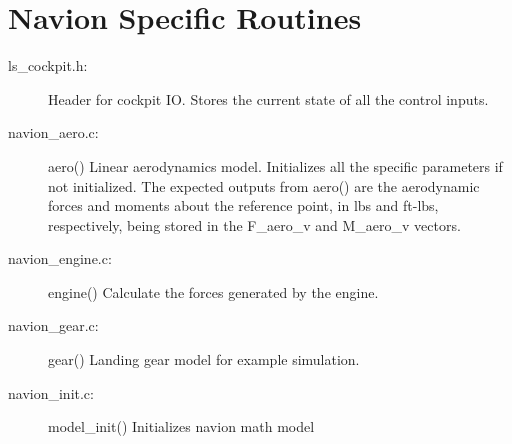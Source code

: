 \documentclass[12pt,titlepage]{article}
\begin{document}
\section{Navion Specific Routines}

\begin{description}
  \item[ls\_cockpit.h:] Header for cockpit IO.  Stores the current
    state of all the control inputs.
    
  \item[navion\_aero.c:] aero() Linear aerodynamics model.  Initializes
    all the specific parameters if not initialized.  The expected
    outputs from aero() are the aerodynamic forces and moments about
    the reference point, in lbs and ft-lbs, respectively, being stored
    in the F\_aero\_v and M\_aero\_v vectors.
    
  \item[navion\_engine.c:] engine() Calculate the forces generated by
    the engine.
    
  \item[navion\_gear.c:] gear() Landing gear model for example simulation.
    
  \item[navion\_init.c:] model\_init() Initializes navion math model
\end{description}
\end{document}
